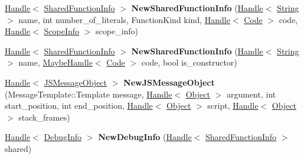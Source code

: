 \begin{DoxyCompactItemize}
\item 
\hyperlink{classv8_1_1internal_1_1_handle}{Handle}$<$ \hyperlink{classv8_1_1internal_1_1_shared_function_info}{Shared\+Function\+Info} $>$ {\bfseries New\+Shared\+Function\+Info} (\hyperlink{classv8_1_1internal_1_1_handle}{Handle}$<$ \hyperlink{classv8_1_1internal_1_1_string}{String} $>$ name, int number\+\_\+of\+\_\+literals, Function\+Kind kind, \hyperlink{classv8_1_1internal_1_1_handle}{Handle}$<$ \hyperlink{classv8_1_1internal_1_1_code}{Code} $>$ code, \hyperlink{classv8_1_1internal_1_1_handle}{Handle}$<$ \hyperlink{classv8_1_1internal_1_1_scope_info}{Scope\+Info} $>$ scope\+\_\+info)\hypertarget{classv8_1_1internal_1_1_factory_aef1b7ca560e297abd5fb2b96ed6fd9d1}{}\label{classv8_1_1internal_1_1_factory_aef1b7ca560e297abd5fb2b96ed6fd9d1}

\item 
\hyperlink{classv8_1_1internal_1_1_handle}{Handle}$<$ \hyperlink{classv8_1_1internal_1_1_shared_function_info}{Shared\+Function\+Info} $>$ {\bfseries New\+Shared\+Function\+Info} (\hyperlink{classv8_1_1internal_1_1_handle}{Handle}$<$ \hyperlink{classv8_1_1internal_1_1_string}{String} $>$ name, \hyperlink{classv8_1_1internal_1_1_maybe_handle}{Maybe\+Handle}$<$ \hyperlink{classv8_1_1internal_1_1_code}{Code} $>$ code, bool is\+\_\+constructor)\hypertarget{classv8_1_1internal_1_1_factory_af55c277b3743a35862d84ac6b26b56a5}{}\label{classv8_1_1internal_1_1_factory_af55c277b3743a35862d84ac6b26b56a5}

\item 
\hyperlink{classv8_1_1internal_1_1_handle}{Handle}$<$ \hyperlink{classv8_1_1internal_1_1_j_s_message_object}{J\+S\+Message\+Object} $>$ {\bfseries New\+J\+S\+Message\+Object} (Message\+Template\+::\+Template message, \hyperlink{classv8_1_1internal_1_1_handle}{Handle}$<$ \hyperlink{classv8_1_1internal_1_1_object}{Object} $>$ argument, int start\+\_\+position, int end\+\_\+position, \hyperlink{classv8_1_1internal_1_1_handle}{Handle}$<$ \hyperlink{classv8_1_1internal_1_1_object}{Object} $>$ script, \hyperlink{classv8_1_1internal_1_1_handle}{Handle}$<$ \hyperlink{classv8_1_1internal_1_1_object}{Object} $>$ stack\+\_\+frames)\hypertarget{classv8_1_1internal_1_1_factory_a5cfb00926cc0b2f5cac150ddb66825b6}{}\label{classv8_1_1internal_1_1_factory_a5cfb00926cc0b2f5cac150ddb66825b6}

\item 
\hyperlink{classv8_1_1internal_1_1_handle}{Handle}$<$ \hyperlink{classv8_1_1internal_1_1_debug_info}{Debug\+Info} $>$ {\bfseries New\+Debug\+Info} (\hyperlink{classv8_1_1internal_1_1_handle}{Handle}$<$ \hyperlink{classv8_1_1internal_1_1_shared_function_info}{Shared\+Function\+Info} $>$ shared)\hypertarget{classv8_1_1internal_1_1_factory_ad1d8d69515ce5511f5796e163c7ceeac}{}\label{classv8_1_1internal_1_1_factory_ad1d8d69515ce5511f5796e163c7ceeac}


\end{DoxyCompactItemize}
